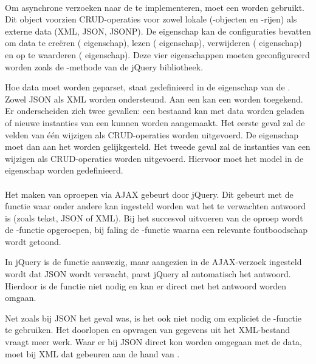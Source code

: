 \paragraph{\kendo}
Om asynchrone verzoeken naar de  te implementeren, moet een  worden gebruikt.
Dit object voorzien CRUD-operaties voor zowel lokale (\js-objecten en \js-rijen) als externe data (XML, JSON, JSONP).
De  eigenschap kan de configuraties bevatten om data te creëren ( eigenschap),  lezen ( eigenschap),  verwijderen ( eigenschap) en op te waarderen ( eigenschap).
Deze vier eigenschappen moeten geconfigureerd worden zoals de -methode van de jQuery bibliotheek.

Hoe data moet worden geparset, staat gedefinieerd in de  eigenschap van de .
Zowel JSON als XML worden ondersteund.
Aan een  kan een  worden toegekend.
Er onderscheiden zich twee gevallen:  een bestaand  kan met data worden geladen of nieuwe instanties van een  kunnen worden aangemaakt.
Het eerste geval zal de velden van één  wijzigen als CRUD-operaties worden uitgevoerd.
De eigenschap moet dan aan het  worden gelijkgesteld.
Het tweede geval zal de instanties van een  wijzigen als CRUD-operaties worden uitgevoerd.
Hiervoor moet het model in de  eigenschap worden gedefinieerd.

\paragraph{\jqm}
Het maken van oproepen via AJAX gebeurt door jQuery. 
Dit gebeurt met de functie  waar onder andere kan ingesteld worden wat het te verwachten antwoord is (zoals tekst, JSON of XML). 
Bij het succesvol uitvoeren van de oproep wordt de -functie opgeroepen, bij faling de -functie waarna een relevante foutboodschap wordt getoond.

In jQuery is de functie  aanwezig, maar aangezien in de AJAX-verzoek ingesteld wordt dat JSON wordt verwacht, parst jQuery al automatisch het antwoord. 
Hierdoor is de functie  niet nodig en kan er direct met het antwoord worden omgaan.

Net zoals bij JSON het geval was, is het ook niet nodig om expliciet de -functie te gebruiken. 
Het doorlopen en opvragen van gegevens uit het XML-bestand vraagt meer werk. 
Waar er bij JSON direct kon worden omgegaan met de data, moet bij XML dat gebeuren aan de hand van .

